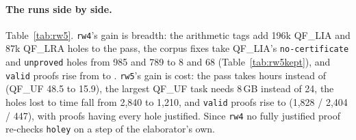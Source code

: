 \documentclass[11pt,a4paper]{article}
\newcommand{\UF}{QF\_UF}
\newcommand{\LIA}{QF\_LIA}
\newcommand{\LRA}{QF\_LRA}
\newcommand{\code}[1]{\texttt{#1}}
\begin{document}
\paragraph{The runs side by side.} Table~\ref{tab:rw5}. \code{rw4}'s gain
is breadth: the arithmetic tags add 196k \LIA{} and 87k \LRA{} holes to the
pass, the corpus fixes take \LIA{}'s \code{no-certificate} and
\code{unproved} holes from 985 and 789 to 8 and 68
(Table~\ref{tab:rw5kept}), and \code{valid} proofs rise from
\rwthreevalidall{} to \rwfourvalid{}. \code{rw5}'s gain is cost: the pass
takes \rwfivepasshours{} hours instead of \rwfourpasshours{} (\UF{} 48.5
to 15.9), the largest \UF{} task needs 8\,GB instead of 24, the holes lost
to time fall from 2,840 to 1,210, and \code{valid} proofs rise to
\rwfivevalid{} (1,828 / 2,404 / 447), with \rwfivefully{} proofs having
every hole justified. Since \code{rw4} no fully justified proof re-checks
\code{holey} on a step of the elaborator's own.

\begin{table}[htbp]\centering\footnotesize
\resizebox{\textwidth}{!}{}
\caption{\code{rw5} and \code{rw4} against \code{rw3}, holes of the proofs
  that ran the pass, as Table~\ref{tab:rw3}. \LIA{} and \LRA{} have more
  holes from \code{rw4} on: the arithmetic preprocessing holes are
  attempted.}\label{tab:rw5}
\end{table}

\begin{table}[htbp]\centering\footnotesize
\resizebox{\textwidth}{!}{}
\caption{Kept holes by the class of their reason. \code{out-of-scope} are
  lambda applications left unreduced; \code{pass-budget} holes the pass
  did not reach.}\label{tab:rw5kept}
\end{table}
\end{document}
